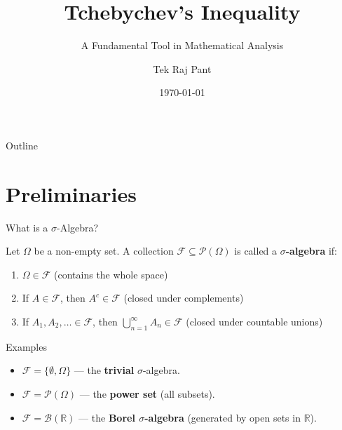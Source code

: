 \documentclass{beamer}
\title[Tchebychev's Inequality]{Tchebychev's Inequality}
\subtitle{A Fundamental Tool in Mathematical Analysis}
\author[Tek Raj Pant]{Tek Raj Pant}
\institute[KU]{Applied Analysis \\ Department of Mathematics \\ Kathmandu University}
\date{\today}
\begin{document}
\begin{frame}
    \titlepage
\end{frame}

\begin{frame}{Outline}
    \tableofcontents
\end{frame}

\section{Preliminaries}

\begin{frame}{What is a $\sigma$-Algebra?}
    \begin{definition}
        Let $\Omega$ be a non-empty set. A collection $\mathscr{F} \subseteq \mathcal{P}(\Omega)$ is called a \textbf{$\sigma$-algebra} if:
        \begin{enumerate}
            \item $\Omega \in \mathscr{F}$ \quad (contains the whole space)
            \item If $A \in \mathscr{F}$, then $A^c \in \mathscr{F}$ \quad (closed under complements)
            \item If $A_1, A_2, \ldots \in \mathscr{F}$, then $\bigcup_{n=1}^\infty A_n \in \mathscr{F}$ \quad (closed under countable unions)
        \end{enumerate}
    \end{definition}

    \begin{exampleblock}{Examples}
        \begin{itemize}
            \item $\mathscr{F} = \{\emptyset, \Omega\}$ — the \textbf{trivial} $\sigma$-algebra.
            \item $\mathscr{F} = \mathcal{P}(\Omega)$ — the \textbf{power set} (all subsets).
            \item $\mathscr{F} = \mathcal{B}(\mathbb{R})$ — the \textbf{Borel $\sigma$-algebra} (generated by open sets in $\mathbb{R}$).
        \end{itemize}
    \end{exampleblock}
\end{frame}
\end{document}

